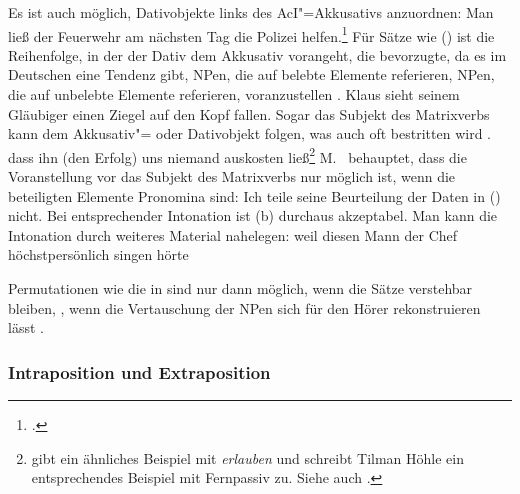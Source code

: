 \noindent
Es ist auch möglich, Dativobjekte links des AcI"=Akkusativs anzuordnen:
\ea Man ließ der Feuerwehr           am     nächsten Tag die Polizei      helfen.\footnote{
        .
      }
\z
Für Sätze wie () ist die Reihenfolge, in der der Dativ dem Akkusativ vorangeht,
die bevorzugte, da es im Deutschen eine Tendenz gibt, NPen, die auf belebte Elemente referieren,
NPen, die auf unbelebte Elemente referieren, voranzustellen \citep*[]{Hoberg81a}.
\ea
Klaus sieht seinem Gläubiger einen Ziegel auf den Kopf fallen.\label{fallen-sehen}
\z
%
Sogar das Subjekt des Matrixverbs kann dem Akkusativ"= oder Dativobjekt folgen,
was auch oft bestritten wird \parencites[]{Grewendorf87a}[]{Grewendorf88a}[]{Wurmbrand98a}[, 306]{Cook2001a}.
\ea
dass  ihn      (den Erfolg) uns      niemand      auskosten ließ\footnote{
        \citet*[]{Haider94b-u} gibt ein ähnliches Beispiel mit \emph{erlauben} und schreibt
        Tilman Höhle ein entsprechendes Beispiel mit Fernpassiv zu. Siehe auch .
}
\z
M.\ \citet[]{MRichter2002b} behauptet, dass die Voranstellung vor das Subjekt des Matrixverbs
nur möglich ist, wenn die beteiligten Elemente Pronomina sind:
\eal
{}
\zl
Ich teile seine Beurteilung der Daten in () nicht. Bei entsprechender Intonation
ist (b) durchaus akzeptabel. Man kann die Intonation durch weiteres Material nahelegen:
\ea
weil diesen Mann der Chef höchstpersönlich singen hörte
\z

\noindent
Permutationen wie die in  sind nur dann
möglich, wenn die Sätze verstehbar bleiben, \dash, wenn die Vertauschung der NPen sich für den Hörer
rekonstruieren lässt \citep[]{Mueller99a}. 


\subsubsection{Intraposition und Extraposition}
\label{sec-aci-ie}


